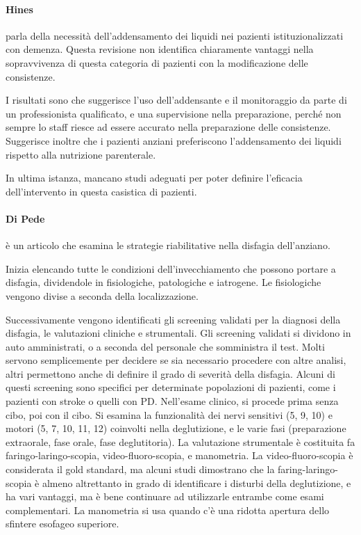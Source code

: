 \paragraph{Hines} \label{par:hin} \cite{Hines2010} parla della necessità 
dell'addensamento dei liquidi nei pazienti istituzionalizzati con demenza.
Questa revisione non identifica chiaramente vantaggi nella sopravvivenza di 
questa categoria di pazienti con la modificazione delle consistenze.

I risultati sono che suggerisce l'uso dell'addensante e il monitoraggio da 
parte di un professionista qualificato, e una supervisione nella preparazione, 
perché non sempre lo staff riesce ad essere accurato nella preparazione delle 
consistenze.
Suggerisce inoltre che i pazienti anziani preferiscono l'addensamento dei 
liquidi rispetto alla nutrizione parenterale.

In ultima istanza, mancano studi adeguati per poter definire l'eficacia 
dell'intervento in questa casistica di pazienti.

\paragraph{Di Pede} \label{par:dip} \cite{DiPede2015} è un articolo che esamina 
le strategie riabilitative nella disfagia dell'anziano.

Inizia elencando tutte le condizioni dell'invecchiamento che possono portare a 
disfagia, dividendole in fisiologiche, patologiche e iatrogene.
Le fisiologiche vengono divise a seconda della localizzazione.

Successivamente vengono identificati gli screening validati per la diagnosi 
della disfagia, le valutazioni cliniche e strumentali.
Gli screening validati si dividono in auto amministrati, o a seconda del 
personale che somministra il test.
Molti servono semplicemente per decidere se sia necessario procedere con altre 
analisi, altri permettono anche di definire il grado di severità della disfagia.
Alcuni di questi screening sono specifici per determinate popolazioni di 
pazienti, come i pazienti con stroke o quelli con PD.
Nell'esame clinico, si procede prima senza cibo, poi con il cibo.
Si esamina la funzionalità dei nervi sensitivi (5, 9, 10) e motori (5, 7, 10, 
11, 12) coinvolti nella deglutizione, e le varie fasi (preparazione extraorale, 
fase orale, fase deglutitoria).
La valutazione strumentale è costituita fa faringo-laringo-scopia, 
video-fluoro-scopia, e manometria.
La video-fluoro-scopia è considerata il gold standard, ma alcuni studi 
dimostrano che la faring-laringo-scopia è almeno altrettanto in grado di 
identificare i disturbi della deglutizione, e ha vari vantaggi, ma è bene 
continuare ad utilizzarle entrambe come esami complementari.
La manometria si usa quando c'è una ridotta apertura dello sfintere esofageo 
superiore.

